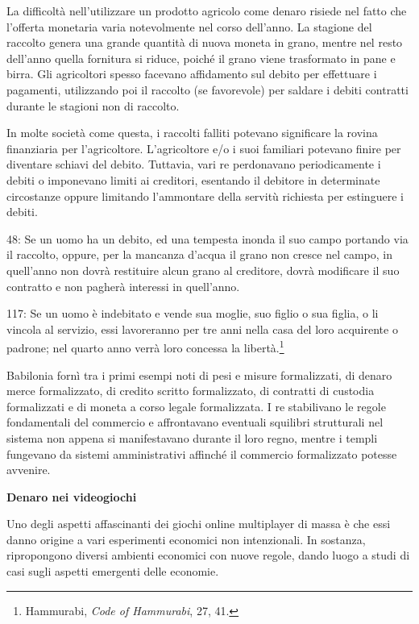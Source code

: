 \documentclass[
  a5paper,
  smalldemyvopaper,10pt,twoside,onecolumn,openright,extrafontsizes,hidelinks]{memoir}
\renewenvironment{quote}%
               {\list{}{\rightmargin=.6cm\leftmargin=.6cm}%
                \itshape \item[]}%
               {\endlist}
\begin{document}
La difficoltà nell'utilizzare un prodotto agricolo come denaro risiede
nel fatto che l'offerta monetaria varia notevolmente nel corso
dell'anno. La stagione del raccolto genera una grande quantità di nuova
moneta in grano, mentre nel resto dell'anno quella fornitura si riduce,
poiché il grano viene trasformato in pane e birra. Gli agricoltori
spesso facevano affidamento sul debito per effettuare i pagamenti,
utilizzando poi il raccolto (se favorevole) per saldare i debiti
contratti durante le stagioni non di raccolto.

In molte società come questa, i raccolti falliti potevano significare la
rovina finanziaria per l'agricoltore. L'agricoltore e/o i suoi familiari
potevano finire per diventare schiavi del debito. Tuttavia, vari re
perdonavano periodicamente i debiti o imponevano limiti ai creditori,
esentando il debitore in determinate circostanze oppure limitando
l'ammontare della servitù richiesta per estinguere i debiti.

\begin{quote}
48: Se un uomo ha un debito, ed una tempesta inonda il suo campo
portando via il raccolto, oppure, per la mancanza d'acqua il grano non
cresce nel campo, in quell'anno non dovrà restituire alcun grano al
creditore, dovrà modificare il suo contratto e non pagherà interessi in
quell'anno.
\end{quote}

\begin{quote}
117: Se un uomo è indebitato e vende sua moglie, suo figlio o sua
figlia, o li vincola al servizio, essi lavoreranno per tre anni nella
casa del loro acquirente o padrone; nel quarto anno verrà loro concessa
la libertà.\footnote{Hammurabi, \emph{Code of Hammurabi}, 27, 41.}
\end{quote}

Babilonia fornì tra i primi esempi noti di pesi e misure formalizzati,
di denaro merce formalizzato, di credito scritto formalizzato, di
contratti di custodia formalizzati e di moneta a corso legale
formalizzata. I re stabilivano le regole fondamentali del commercio e
affrontavano eventuali squilibri strutturali nel sistema non appena si
manifestavano durante il loro regno, mentre i templi fungevano da
sistemi amministrativi affinché il commercio formalizzato potesse
avvenire.

\textbf{Denaro nei videogiochi}

Uno degli aspetti affascinanti dei giochi online multiplayer di massa è
che essi danno origine a vari esperimenti economici non intenzionali. In
sostanza, ripropongono diversi ambienti economici con nuove regole,
dando luogo a studi di casi sugli aspetti emergenti delle economie.
\end{document}
